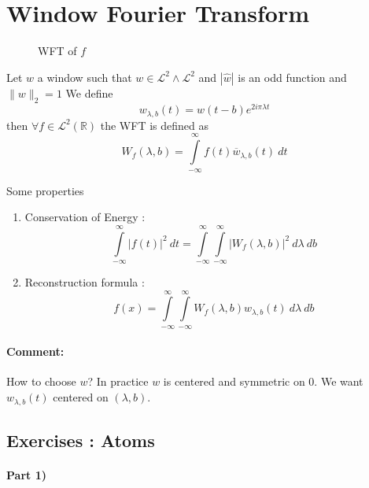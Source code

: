 \chapter{Window Fourier Transform} 
\begin{figure}[ht]
    \centering
    \caption{WFT of $f$}
    \label{fig:wftonf}
\end{figure}

\begin{defn}[Window]
    Let $ w $ a window such that $ w \in \mathscr{L}^2 \wedge \mathscr{L}^2 $ and $ \left
    | \widehat{w} \right |  $ is an odd function and $ \| w \|^{ }_{ 2} = 1 $
    We define 
    \[
        w _{ \lambda, b }^{  } (t) = w(t-b) e^{ 2i\pi\lambda t} 
    \]
    then $ \forall f \in \mathscr{L}^2(\mathbb{R})   $ the WFT is defined as 
    \[
        W_f(\lambda,b) = \int\limits_{-\infty}^{\infty} f(t) \overline{w}_{\lambda, b}(t)
        \ dt 
    \]
    \label{def:Window}
\end{defn}

Some properties 
\begin{enumerate}[label={(\alph*)}]
    \item Conservation of Energy : 
        \[
            \int\limits_{-\infty}^{\infty} \left | f(t)  \right | ^2 \ dt =
            \int\limits_{-\infty}^{\infty} \int\limits_{-\infty}^{\infty} \left |
            W_f\left( \lambda, b\right)  \right | ^2 \ d\lambda \ db
        \]
    \item Reconstruction formula : 
        \[
            f(x) = \int\limits_{-\infty}^{\infty} \int\limits_{-\infty}^{\infty}
            W_f(\lambda, b) w_{\lambda, b} (t) \ d\lambda \ db
        \]
\end{enumerate}
\subsubsection{Comment:}
How to choose $ w $? In practice $ w $ is centered and symmetric on 0. We want $
w_{\lambda, b}(t) $ centered on $ \left( \lambda, b\right)  $. 
\section{Exercises : Atoms}
\label{sec:Exercises : Atoms}
 
\subsubsection{Part 1)}


